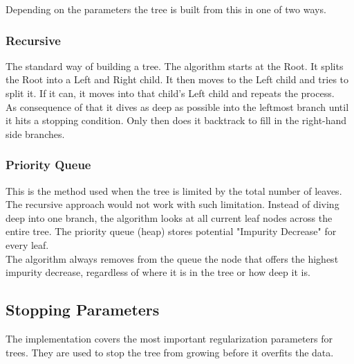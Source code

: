 Depending on the parameters the tree is built from this in one of two ways.
\subsubsection{Recursive}
The standard way of building a tree. The algorithm starts at the Root. It splits the Root into a Left and Right child. It then moves to the Left child and tries to split it. If it can, it moves into that child's Left child and repeats the process.\\
As consequence of that it dives as deep as possible into the leftmost branch until it hits a stopping condition. Only then does it backtrack to fill in the right-hand side branches.
\subsubsection{Priority Queue}
This is the method used when the tree is limited by the total number of leaves. The recursive approach would not work with such limitation.
Instead of diving deep into one branch, the algorithm looks at all current leaf nodes across the entire tree. The priority queue (heap) stores potential "Impurity Decrease" for every leaf.\\
The algorithm always removes from the queue the node that offers the highest impurity decrease, regardless of where it is in the tree or how deep it is.

\subsection{Stopping Parameters}
The implementation covers the most important regularization parameters for trees. They are used to stop the tree from growing before it overfits the data. 

